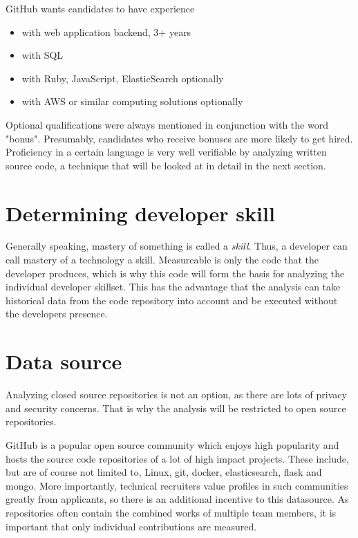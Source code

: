 GitHub wants candidates to have experience
\begin{itemize}
    \item with web application backend, 3+ years
    \item with SQL
    \item with Ruby, JavaScript, ElasticSearch optionally
    \item with AWS or similar computing solutions optionally
\end{itemize}

Optional qualifications were always mentioned in conjunction with the
word "bonus". Presumably, candidates who receive bonuses are more
likely to get hired. Proficiency in a certain language is very well
verifiable by analyzing written source code, a technique that will
be looked at in detail in the next section.

\section{Determining developer skill}
Generally speaking, mastery of something is called a \textit{skill}.
Thus, a developer can call mastery of a technology a skill.
Measureable is only the code that the developer produces, which
is why this code will form the basis for analyzing the individual
developer skillset. This has the advantage that the analysis
can take historical data from the code repository into account
and be executed without the developers presence.

\section{Data source}
Analyzing closed source repositories is not an option, as there are lots
of privacy and security concerns. That is why the analysis will be
restricted to open source repositories.
\newline

GitHub is a popular open source community which enjoys high popularity
and hosts the source code repositories of a lot of high impact projects.
These include, but are of course not limited to,
Linux, git, docker, elasticsearch, flask and mongo\cite{rpfd:2014}.
More importantly, technical recruiters value profiles in such communities
greatly from applicants\cite{md:2013}, so there is an additional
incentive to this datasource. As repositories
often contain the combined works of multiple team members,
it is important that only individual contributions are measured.

